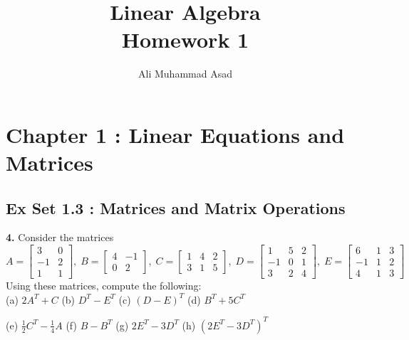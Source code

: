 \documentclass[addpoints]{exam}
\title{Linear Algebra\\ Homework 1}
\author{Ali Muhammad Asad}
\begin{document}
\maketitle
\section*{\textbf{Chapter 1 : Linear Equations and Matrices}}

\subsection*{\textbf{Ex Set 1.3 : Matrices and Matrix Operations}}

\begin{questions}
    \question
    \textbf{4. } Consider the matrices
    $$ A = \begin{bmatrix}
        3 & 0 \\ -1 & 2 \\ 1 & 1
    \end{bmatrix},\; B = \begin{bmatrix}
        4 & -1 \\ 0 & 2
    \end{bmatrix},\; C = \begin{bmatrix}
        1 & 4 & 2 \\ 3 & 1 & 5
    \end{bmatrix},\; D = \begin{bmatrix}
        1 & 5 & 2 \\ -1 &  0 & 1 \\ 3 & 2 & 4
    \end{bmatrix},\; E = \begin{bmatrix}
        6 & 1 & 3 \\ -1 & 1 & 2 \\ 4 & 1 & 3
    \end{bmatrix} $$
    Using these matrices, compute the following: \\ 
    (a) $ 2A^T + C $ \hspace{10mm} (b) $ D^T - E^T $ \hspace{10mm} (c) $ (D - E)^T $ \hspace{10mm} (d) $ B^T + 5C^T $
    
    \vspace{2mm} (e) $ \frac{1}{2}C^T - \frac{1}{4}A $ \hspace{7.5mm} (f) $ B - B^T $ \hspace{13mm} (g) $ 2E^T - 3D^T $  \hspace{7mm} (h) $ (2E^T - 3D^T)^T $
    \begin{solution}


\end{solution}
\end{questions}
\end{document}
